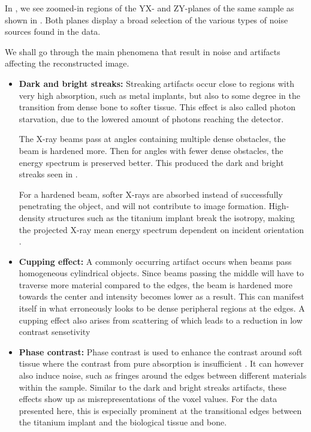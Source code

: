 In , we see zoomed-in regions of the YX- and ZY-planes of the
same sample as shown in . Both planes display a broad
selection of the various types of noise sources found in the data.

We shall go through the main phenomena that result in noise and artifacts
affecting the reconstructed image.

\begin{itemize}
  \item \textbf{Dark and bright streaks:} Streaking artifacts occur close to
	regions with very high absorption, such as metal implants, but also
	to some degree in the transition from dense bone to softer
	tissue.
	This effect is also called photon starvation, due to the
	lowered amount of photons reaching the detector.

	The X-ray beams pass at angles containing
	multiple dense obstacles, the beam is hardened more. Then for
	angles with fewer dense obstacles, the energy spectrum is
	preserved better. This produced the dark and bright streaks
	seen in .

	For a hardened beam, softer X-rays are absorbed instead of
	successfully penetrating the object, and will not contribute to
	image formation.  High-density structures such as the titanium
	implant break the isotropy, making the projected X-ray mean
	energy spectrum dependent on incident orientation
	\citep{srnoise}.



  \item \textbf{Cupping effect:} A commonly occurring artifact occurs when beams pass
    homogeneous cylindrical objects. Since beams passing the middle will have to
	traverse more material compared to the edges, the beam is hardened more
	towards the center and intensity becomes lower as a result. This can
	manifest itself in what erroneously looks to be dense peripheral
	regions at the edges. A cupping effect also arises from scattering of
	which leads to a reduction in low contrast sensetivity

  \item \textbf{Phase contrast:} Phase contrast is used to enhance the contrast
	around soft tissue where the contrast from pure absorption is
	insufficient \citep{phasecontrast}. It can however also induce
	noise, such as fringes around the edges between different
	materials within the sample\citep{srnoise}. Similar to the dark
	and bright streaks artifacts, these effects show up as
	misrepresentations of the voxel values. For the data presented
	here, this is especially prominent at the transitional edges
	between the titanium implant and the biological tissue and
	bone.


\end{itemize}
